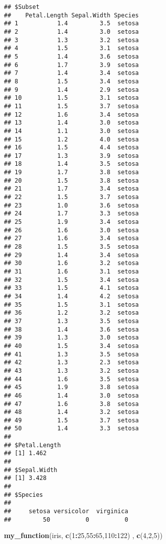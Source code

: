 \documentclass[
]{article}
\newenvironment{Shaded}{\begin{snugshade}}{\end{snugshade}}
\newcommand{\DecValTok}[1]{\textcolor[rgb]{0.00,0.00,0.81}{#1}}
\newcommand{\KeywordTok}[1]{\textcolor[rgb]{0.13,0.29,0.53}{\textbf{#1}}}
\newcommand{\NormalTok}[1]{#1}
\newcommand{\OperatorTok}[1]{\textcolor[rgb]{0.81,0.36,0.00}{\textbf{#1}}}
\begin{document}
\begin{verbatim}
## $Subset
##    Petal.Length Sepal.Width Species
## 1           1.4         3.5  setosa
## 2           1.4         3.0  setosa
## 3           1.3         3.2  setosa
## 4           1.5         3.1  setosa
## 5           1.4         3.6  setosa
## 6           1.7         3.9  setosa
## 7           1.4         3.4  setosa
## 8           1.5         3.4  setosa
## 9           1.4         2.9  setosa
## 10          1.5         3.1  setosa
## 11          1.5         3.7  setosa
## 12          1.6         3.4  setosa
## 13          1.4         3.0  setosa
## 14          1.1         3.0  setosa
## 15          1.2         4.0  setosa
## 16          1.5         4.4  setosa
## 17          1.3         3.9  setosa
## 18          1.4         3.5  setosa
## 19          1.7         3.8  setosa
## 20          1.5         3.8  setosa
## 21          1.7         3.4  setosa
## 22          1.5         3.7  setosa
## 23          1.0         3.6  setosa
## 24          1.7         3.3  setosa
## 25          1.9         3.4  setosa
## 26          1.6         3.0  setosa
## 27          1.6         3.4  setosa
## 28          1.5         3.5  setosa
## 29          1.4         3.4  setosa
## 30          1.6         3.2  setosa
## 31          1.6         3.1  setosa
## 32          1.5         3.4  setosa
## 33          1.5         4.1  setosa
## 34          1.4         4.2  setosa
## 35          1.5         3.1  setosa
## 36          1.2         3.2  setosa
## 37          1.3         3.5  setosa
## 38          1.4         3.6  setosa
## 39          1.3         3.0  setosa
## 40          1.5         3.4  setosa
## 41          1.3         3.5  setosa
## 42          1.3         2.3  setosa
## 43          1.3         3.2  setosa
## 44          1.6         3.5  setosa
## 45          1.9         3.8  setosa
## 46          1.4         3.0  setosa
## 47          1.6         3.8  setosa
## 48          1.4         3.2  setosa
## 49          1.5         3.7  setosa
## 50          1.4         3.3  setosa
## 
## $Petal.Length
## [1] 1.462
## 
## $Sepal.Width
## [1] 3.428
## 
## $Species
## 
##     setosa versicolor  virginica 
##         50          0          0
\end{verbatim}

\begin{Shaded}
\begin{Highlighting}[]
\KeywordTok{my_function}\NormalTok{(iris, }\KeywordTok{c}\NormalTok{(}\DecValTok{1}\OperatorTok{:}\DecValTok{25}\NormalTok{,}\DecValTok{55}\OperatorTok{:}\DecValTok{65}\NormalTok{,}\DecValTok{110}\OperatorTok{:}\DecValTok{122}\NormalTok{) , }\KeywordTok{c}\NormalTok{(}\DecValTok{4}\NormalTok{,}\DecValTok{2}\NormalTok{,}\DecValTok{5}\NormalTok{))}
\end{Highlighting}
\end{Shaded}
\end{document}
